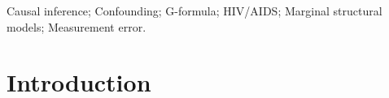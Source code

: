 \documentclass[useAMS,usenatbib,referee]{biom}
\begin{document}
%

\begin{keywords}
Causal inference; Confounding; G-formula; HIV/AIDS;
Marginal structural models; Measurement error.
\end{keywords}


\maketitle


%

\section{Introduction}
\label{s:intro}
\end{document}
